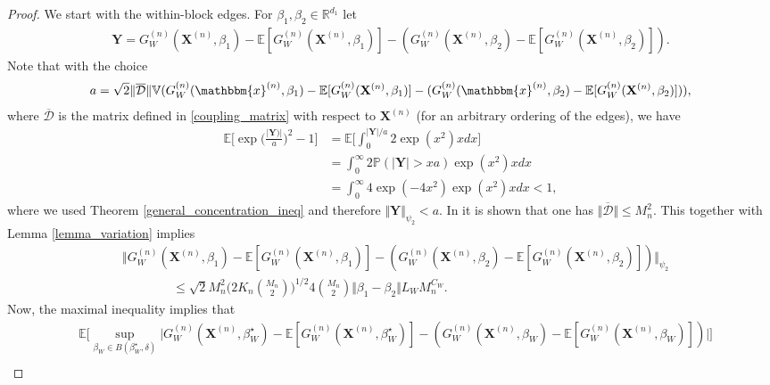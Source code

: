 \documentclass{article}
\begin{document}
\begin{proof}
    We start with the within-block edges. For $\beta_1, \beta_2 \in \mathbb{R}^{d_1}$ let
    \begin{align*}
        \mathbf{Y} = G_W^{(n)}(\mathbf{X}^{(n)},\beta_1) - \mathbb{E}[G_W^{(n)}(\mathbf{X}^{(n)},\beta_1)] - (G_W^{(n)}(\mathbf{X}^{(n)},\beta_2) - \mathbb{E}[G_W^{(n)}(\mathbf{X}^{(n)},\beta_2)]).
    \end{align*}
    Note that with the choice
    \begin{align*}
        a= \sqrt{2}\Vert \overline{\mathcal{D}} \Vert \mathbb{V} (G_W^{(n)}(\mathbbm{x}^{(n)},\beta_1) - \mathbb{E}[G_W^{(n)}(\mathbf{X}^{(n)},\beta_1)] - (G_W^{(n)}(\mathbbm{x}^{(n)},\beta_2) - \mathbb{E}[G_W^{(n)}(\mathbf{X}^{(n)},\beta_2)])),
    \end{align*}
    where $\overline{\mathcal{D}}$ is the matrix defined in \eqref{coupling_matrix} with respect to $\mathbf{X}^{(n)}$ (for an arbitrary ordering of the edges), we have
    \begin{align*}
        \mathbb{E}\bigg[ \exp\bigg( \frac{\vert \mathbf{Y}) \vert }{a}  \bigg)^2 -1  \bigg]  &= \mathbb{E}\bigg[ \int_{0}^{\vert \mathbf{Y} \vert /a}  2\exp(x^2) x dx  \bigg] \\
        &= \int_0^{\infty} 2 \mathbb{P} (\vert \mathbf{Y} \vert > xa   )\exp(x^2) x dx \\
        &= \int_0^{\infty} 4\exp(-4 x^2) \exp(x^2) x dx <1,
    \end{align*}
    where we used Theorem \ref{general_concentration_ineq} and therefore  $\Vert \mathbf{Y} \Vert_{\psi_2} < a$. In \cite{stewart2026rates} it is shown that one has $\Vert \overline{\mathcal{D}} \Vert \leq M_n^2$. This  together with Lemma \ref{lemma_variation} implies
    \begin{align*}
        &\Vert G_W^{(n)}(\mathbf{X}^{(n)},\beta_1) - \mathbb{E}[G_W^{(n)}(\mathbf{X}^{(n)},\beta_1)] - (G_W^{(n)}(\mathbf{X}^{(n)},\beta_2) - \mathbb{E}[G_W^{(n)}(\mathbf{X}^{(n)},\beta_2)]) \Vert_{\psi_2} \\
        & \qquad \qquad \leq \sqrt{2} M_n^2 \bigg( 2K_n\binom{M_n}{2} \bigg)^{1/2}  4 \binom{M_n}{2} \Vert \beta_1 - \beta_2 \Vert L_W M_n^{C_W}.
    \end{align*}
    Now, the maximal inequality \cite[Theorem 2.2.4]{vandervaart2023weak} implies that
    \begin{align*}
        &\mathbb{E}\bigg[\sup_{\beta_W \in B(\beta_W^{\star},\delta)} \Big\vert G_W^{(n)}(\mathbf{X}^{(n)}, \beta_W^{\star}) - \mathbb{E}[ G_W^{(n)}(\mathbf{X}^{(n)}, \beta_W^{\star})] - (G_W^{(n)}(\mathbf{X}^{(n)}, \beta_W) - \mathbb{E}[ G_W^{(n)}(\mathbf{X}^{(n)}, \beta_W)] ) \Big\vert   \bigg] \\

\end{align*}
\end{proof}
\end{document}
